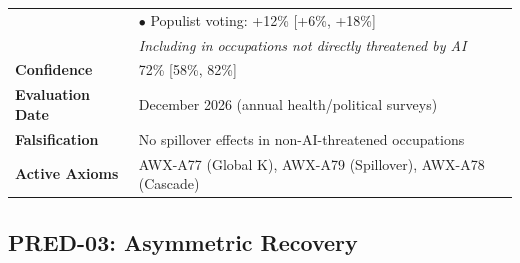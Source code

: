 \begin{table}[htbp]
\begin{tabular}{p{3cm}p{11cm}}
& $\bullet$ Populist voting: +12\% [+6\%, +18\%] \\
& \emph{Including in occupations not directly threatened by AI} \\
\textbf{Confidence} & 72\% [58\%, 82\%] \\
\textbf{Evaluation Date} & December 2026 (annual health/political surveys) \\
\textbf{Falsification} & No spillover effects in non-AI-threatened occupations \\
\textbf{Active Axioms} & AWX-A77 (Global K), AWX-A79 (Spillover), AWX-A78 (Cascade) \\
\bottomrule
\end{tabular}
\end{table}


\subsection{PRED-03: Asymmetric Recovery}
\label{subsec:pred-03-calc}

